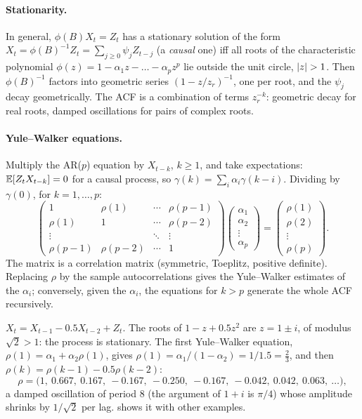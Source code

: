 \begin{notechapter}
\paragraph{Stationarity.} In general, $\phi(B)X_t = Z_t$ has a stationary solution of the form
$X_t = \phi(B)^{-1}Z_t = \sum_{j\geq0}\psi_jZ_{t-j}$ (a \emph{causal} one) iff all roots of the characteristic polynomial
$\phi(z) = 1 - \alpha_1z - \dots - \alpha_pz^p$ lie outside the unit circle, $\abs z>1$. Then $\phi(B)^{-1}$ factors into
geometric series $(1 - z/z_r)^{-1}$, one per root, and the $\psi_j$ decay geometrically. The ACF is a
combination of terms $z_r^{-k}$: geometric decay for real roots, damped oscillations for pairs
of complex roots.

\paragraph{Yule--Walker equations.} Multiply the AR($p$) equation by $X_{t-k}$, $k\geq1$, and take
expectations: $\mathbb{E}[Z_tX_{t-k}] = 0$ for a causal process, so $\gamma(k) = \sum_i\alpha_i\gamma(k - i)$. Dividing by $\gamma(0)$, for
$k = 1,\dots,p$:
\[
  \begin{pmatrix}1&\rho(1)&\cdots&\rho(p - 1)\\\rho(1)&1&\cdots&\rho(p - 2)\\\vdots&&\ddots&\vdots\\\rho(p - 1)&\rho(p - 2)&\cdots&1\end{pmatrix}
  \begin{pmatrix}\alpha_1\\\alpha_2\\\vdots\\\alpha_p\end{pmatrix}
  = \begin{pmatrix}\rho(1)\\\rho(2)\\\vdots\\\rho(p)\end{pmatrix}.
\]
The matrix is a correlation matrix (symmetric, Toeplitz, positive definite). Replacing $\rho$
by the sample autocorrelations gives the Yule--Walker estimates of the $\alpha_i$; conversely,
given the $\alpha_i$, the equations for $k>p$ generate the whole ACF recursively.

\begin{example}\label{linear-time-series:ex:ar2}
$X_t = X_{t-1} - 0.5X_{t-2} + Z_t$. The roots of $1 - z + 0.5z^2$ are $z = 1\pm i$, of modulus $\sqrt2>1$: the process is
stationary. The first Yule--Walker equation, $\rho(1) = \alpha_1 + \alpha_2\rho(1)$, gives
$\rho(1) = \alpha_1/(1 - \alpha_2) = 1/1.5 = \frac23$, and then $\rho(k) = \rho(k - 1) - 0.5\rho(k - 2)$:
\[
  \rho = \bigl(1,\ 0.667,\ 0.167,\ -0.167,\ -0.250,\ -0.167,\ -0.042,\ 0.042,\ 0.063,\ \dots\bigr),
\]
a damped oscillation of period $8$ (the argument of $1 + i$ is $\pi/4$) whose amplitude shrinks by $1/\sqrt2$
per lag.  shows it with other examples.
\end{example}


\end{notechapter}
